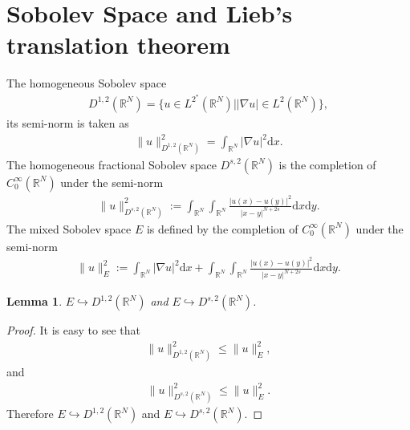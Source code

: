 \documentclass[12pt,a4paper,reqno]{amsart}
\numberwithin{equation}{section}
\newtheorem{lemma}{Lemma}[section]
\begin{document}
\section{Sobolev Space and Lieb's translation theorem}
The homogeneous Sobolev space
\begin{equation*}
\begin{aligned}
D^{1,2}(\mathbb{R}^{N})
=
\{u\in L^{2^{*}}(\mathbb{R}^{N})|
|\nabla u|\in L^{2}(\mathbb{R}^{N})\},
\end{aligned}
\end{equation*}
its semi-norm is taken as
\begin{equation*}
\begin{aligned}
\|u\|_{D^{1,2}
(\mathbb{R}^{N})}^{2}
=\int_{\mathbb{R}^{N}}
|\nabla u|^{2}
\mathrm{d}x.
\end{aligned}
\end{equation*}
The homogeneous fractional Sobolev space $D^{s,2}(\mathbb{R}^{N})$ is the completion of $C_{0}^{\infty}(\mathbb{R}^{N})$ under the semi-norm
\begin{equation*}
\begin{aligned}
\|u\|_{D^{s,2}(\mathbb{R}^{N})}^{2}:=
\int_{\mathbb{R}^{N}}\int_{\mathbb{R}^{N}}\frac{|u(x)-u(y)|^{2}}{|x-y|^{N+2s}}\mathrm{d}x\mathrm{d}y.
\end{aligned}
\end{equation*}
The mixed Sobolev space $E$ is defined by the completion of $C^{\infty}_{0}(\mathbb{R}^{N})$ under the semi-norm
\begin{equation*}
\begin{aligned}
\|u\|_{E}^{2}:=
\int_{\mathbb{R}^{N}}
|\nabla u|^{2}
\mathrm{d}x
+
\int_{\mathbb{R}^{N}}
\int_{\mathbb{R}^{N}}
\frac{|u(x)-u(y)|^{2}}{|x-y|^{N+2s}}
\mathrm{d}x
\mathrm{d}y.
\end{aligned}
\end{equation*}

\begin{lemma}\label{Lemma2.1}
$E\hookrightarrow D^{1,2}(\mathbb{R}^{N})$ and
$E\hookrightarrow D^{s,2}(\mathbb{R}^{N})$.
\end{lemma}
\begin{proof}
It is easy to see that
\begin{equation*}
\begin{aligned}
\|u\|_{D^{1,2}(\mathbb{R}^{N})}^{2}
\leqslant \|u\|_{E}^{2},
\end{aligned}
\end{equation*}
and
\begin{equation*}
\begin{aligned}
\|u\|_{D^{s,2}(\mathbb{R}^{N})}^{2}
\leqslant \|u\|_{E}^{2}.
\end{aligned}
\end{equation*}
Therefore $E\hookrightarrow D^{1,2}(\mathbb{R}^{N})$ and
$E\hookrightarrow D^{s,2}(\mathbb{R}^{N})$.
\end{proof}
\end{document}
